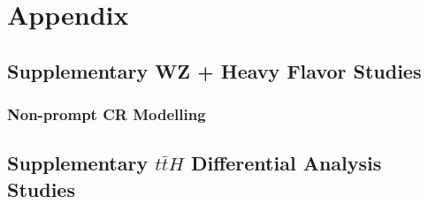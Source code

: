 \documentclass[12pt]{report}	%
\theoremstyle{definition}
\theoremstyle{remark}
\begin{document}
%
%
\appendix
{}%
\chapter{Appendix}

%

\section{Supplementary WZ + Heavy Flavor Studies}
\label{apx:WZ}

\subsection{Non-prompt CR Modelling}
\label{sec:fakeCR_plots}


%
                                                                                                                             
%
                                                                                                                             
\section{Supplementary $t\bar{t}H$ Differential Analysis Studies}                                                            
\label{apx:MVA}                                                                                        
                                                                                    
% 
\end{document}
